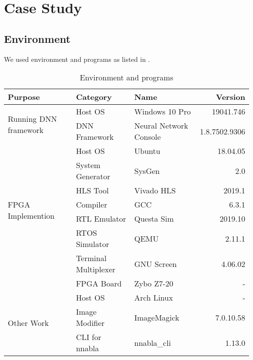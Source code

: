 
\chapter{Case Study}
\section{Environment}
We used environment and programs as listed in .

\begin{table}[tbp]
  \centering
  \caption{Environment and programs}
  \label{tab:programlist}
  \begin{adjustwidth}{-2in}{-2in}
  \centering
  \begin{tabular}{l|llr}\hline\hline
    Purpose & Category          & Name   & Version\\\hline
    \multirow{2}{*}{
      Running DNN framework
    }       & Host OS           & Windows 10 Pro  & 19041.746 \\
            & DNN Framework     & Neural Network Console & 1.8.7502.9306 \\\hline
    \multirow{7}{*}{
      FPGA Implemention
    }       & Host OS           & Ubuntu & 18.04.05 \\
            & System Generator  & SysGen    & 2.0 \\
            & HLS Tool          & Vivado HLS & 2019.1 \\
            & Compiler          & GCC & 6.3.1\\
            & RTL Emulator     & Questa Sim & 2019.10 \\
            & RTOS Simulator    & QEMU & 2.11.1 \\
            & Terminal Multiplexer & GNU Screen & 4.06.02 \\
            & FPGA Board        & Zybo Z7-20 & - \\\hline
    \multirow{3}{*}{
      Other Work
    }       & Host OS           & Arch Linux  & - \\
            & Image Modifier    & ImageMagick & 7.0.10.58 \\
            & CLI for nnabla    & nnabla\_cli & 1.13.0 \\\hline
  \end{tabular}
  \end{adjustwidth}
\end{table}
